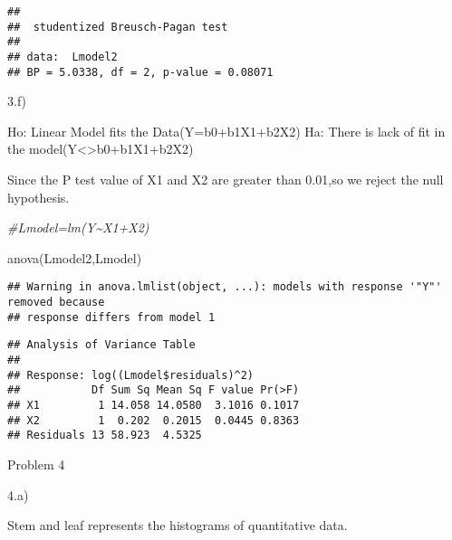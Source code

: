 \documentclass[
]{article}
\newenvironment{Shaded}{\begin{snugshade}}{\end{snugshade}}
\newcommand{\CommentTok}[1]{\textcolor[rgb]{0.56,0.35,0.01}{\textit{#1}}}
\newcommand{\DecValTok}[1]{\textcolor[rgb]{0.00,0.00,0.81}{#1}}
\newcommand{\FunctionTok}[1]{\textcolor[rgb]{0.00,0.00,0.00}{#1}}
\newcommand{\NormalTok}[1]{#1}
\newcommand{\OtherTok}[1]{\textcolor[rgb]{0.56,0.35,0.01}{#1}}
\newcommand{\SpecialCharTok}[1]{\textcolor[rgb]{0.00,0.00,0.00}{#1}}
\begin{document}
\begin{Shaded}
\end{Shaded}

\begin{verbatim}
## 
##  studentized Breusch-Pagan test
## 
## data:  Lmodel2
## BP = 5.0338, df = 2, p-value = 0.08071
\end{verbatim}

3.f)

Ho: Linear Model fits the Data(Y=b0+b1X1+b2X2) Ha: There is lack of fit
in the model(Y\textless\textgreater b0+b1X1+b2X2)

Since the P test value of X1 and X2 are greater than 0.01,so we reject
the null hypothesis.

\begin{Shaded}
\begin{Highlighting}[]
\CommentTok{\#Lmodel=lm(Y\textasciitilde{}X1+X2)}

\FunctionTok{anova}\NormalTok{(Lmodel2,Lmodel)}
\end{Highlighting}
\end{Shaded}

\begin{verbatim}
## Warning in anova.lmlist(object, ...): models with response '"Y"' removed because
## response differs from model 1
\end{verbatim}

\begin{verbatim}
## Analysis of Variance Table
## 
## Response: log((Lmodel$residuals)^2)
##           Df Sum Sq Mean Sq F value Pr(>F)
## X1         1 14.058 14.0580  3.1016 0.1017
## X2         1  0.202  0.2015  0.0445 0.8363
## Residuals 13 58.923  4.5325
\end{verbatim}

Problem 4

4.a)

Stem and leaf represents the histograms of quantitative data.
\end{document}
